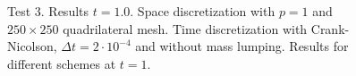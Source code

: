 \begin{figure}
\caption{ Test 3. Results $t = 1.0$. Space discretization with $p=1$ and $250\times 250$ quadrilateral mesh. Time discretization with Crank-Nicolson, $\Delta t = 2 \cdot 10^{-4}$ and without mass lumping. Results for different schemes at $t = 1$.}\label{fig-square1}
\end{figure}


 

